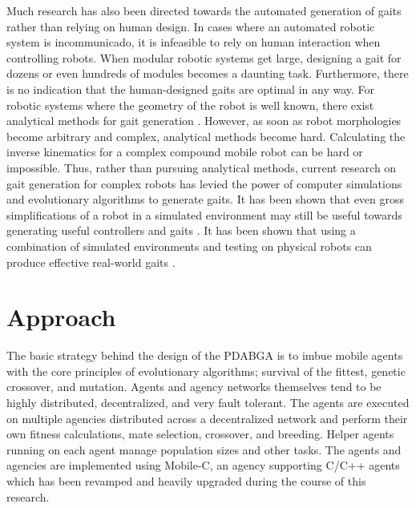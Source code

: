     Much research has also been directed towards the automated generation of
      gaits rather than relying on human design. 
    In cases where an automated robotic system is incommunicado, it is
    infeasible to rely on human interaction when controlling robots. 
    When modular robotic systems get large, designing a gait for dozens or even
      hundreds of modules becomes a daunting task.
    Furthermore, there is no indication that the human-designed gaits are
      optimal in any way. 
    For robotic systems where the geometry of the robot is well known, there
      exist analytical methods for gait generation \cite{Weingarten2004}.
    However, as soon as robot morphologies become arbitrary and complex,
      analytical methods become hard. 
    Calculating the inverse kinematics for a complex compound mobile robot can
      be hard or impossible. 
    Thus, rather than pursuing analytical methods, current research on gait
      generation for complex robots has levied the power of computer simulations
      and evolutionary algorithms to generate gaits. 
    It has been shown that even gross simplifications of a robot in a simulated
      environment may still be useful towards generating useful controllers and
      gaits \cite{Jakobi1995, Jakobi1998, Bongard2004, Lipson2006,
      Zagal2007}. 
    It has been shown that using a combination of simulated environments and
      testing on physical robots can produce effective real-world gaits
      \cite{Zagal2007, Koos2010}. 


  \section{Approach} %
    The basic strategy behind the design of the PDABGA is to imbue mobile 
      agents with the core principles of evolutionary algorithms; survival 
      of the fittest, genetic crossover, and mutation. 
    Agents and agency networks themselves tend to be highly distributed, 
      decentralized, and very fault tolerant. 
    The agents are executed on multiple agencies distributed across a 
      decentralized network and perform their own fitness calculations, mate
      selection, crossover, and breeding. 
    Helper agents running on each agent manage population sizes and other
      tasks.   
    The agents and agencies are implemented using Mobile-C, an agency
      supporting C/C++ agents which has been revamped and heavily upgraded during
      the course of this research.

